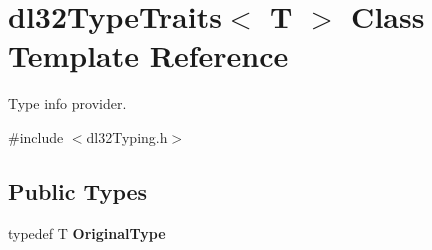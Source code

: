 \hypertarget{classdl32_type_traits}{\section{dl32\-Type\-Traits$<$ T $>$ Class Template Reference}
\label{classdl32_type_traits}
}


Type info provider.  




{\ttfamily \#include $<$dl32\-Typing.\-h$>$}

\subsection*{Public Types}
\begin{DoxyCompactItemize}
\item 
\hypertarget{classdl32_type_traits_afb038b61c98ff7e611b8fdfff9f93017}{typedef T {\bfseries Original\-Type}}\label{classdl32_type_traits_afb038b61c98ff7e611b8fdfff9f93017}

\end{DoxyCompactItemize}
